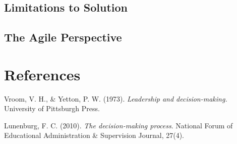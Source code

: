 \documentclass[a4paper,12pt]{report}
\begin{document}
\section{Limitations to Solution}
\section{The Agile Perspective}

\chapter{References}
\begin{thebibliography}{9}

Vroom, V. H., \& Yetton, P. W. (1973). \textit{Leadership and decision-making.} University of Pittsburgh Press.

Lunenburg, F. C. (2010). \textit{The decision-making process}. National Forum of Educational Administration \& Supervision Journal, 27(4).



\end{thebibliography}
\end{document}
